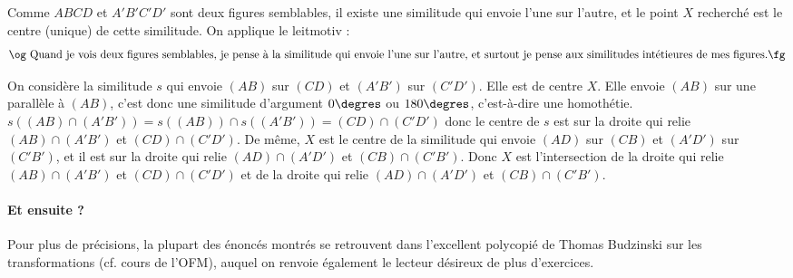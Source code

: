 \begin{sol}
Comme $ABCD$ et $A'B'C'D'$ sont deux figures semblables, il existe une similitude qui envoie
l'une sur l'autre, et le point $X$ recherché est le centre (unique) de cette similitude.
On applique le leitmotiv :
$$\mbox{\og Quand je vois deux figures semblables, je pense à la similitude qui envoie l'une sur l'autre, et surtout je pense aux similitudes intétieures de mes figures.\fg}$$

On considère la similitude $s$ qui envoie $(AB)$ sur $(CD)$ et $(A'B')$ sur $(C'D')$. 
Elle est de centre $X$. Elle envoie $(AB)$ sur une parallèle à $(AB)$, c'est donc 
une similitude d'argument $0\degres$ ou $180\degres$, c'est-à-dire une 
homothétie. $s((AB)\cap (A'B'))=s((AB))\cap s((A'B'))= (CD)\cap (C'D')$ donc 
le centre de $s$ est sur la droite qui relie $(AB)\cap (A'B')$ et
$(CD)\cap (C'D')$. De même, $X$ est le centre de la similitude qui envoie $(AD)$ 
sur $(CB)$ et $(A'D')$ sur $(C'B')$, et il est sur la droite qui relie $(AD)\cap (A'D')$ et
$(CB)\cap (C'B')$. Donc $X$ est l'intersection de la droite qui relie $(AB)\cap (A'B')$ et
$(CD)\cap (C'D')$ et de la droite qui relie $(AD)\cap (A'D')$ et
$(CB)\cap (C'B')$. 
\end{sol}

\paragraph{Et ensuite ?}
Pour plus de précisions, la plupart des énoncés montrés se retrouvent dans l'excellent polycopié de
Thomas Budzinski sur les transformations (cf. cours de l'OFM), auquel on renvoie
également le lecteur désireux de plus d'exercices.
